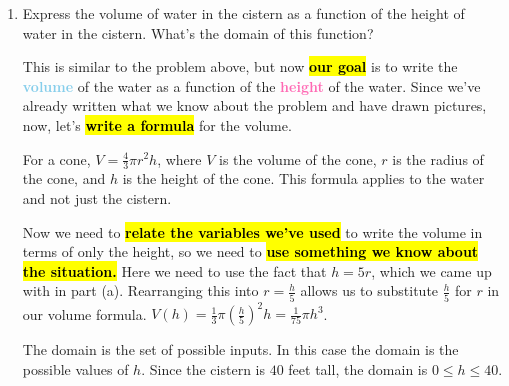 \documentclass{article}
\newcommand{\goal}[1]{\textbf{\textcolor{skyblue}{#1}}}
\newcommand{\indvar}[1]{\textbf{\textcolor{hotpink}{#1}}}
\begin{document}
\begin{enumerate}
\begin{enumerate}
  \item
    \begin{problem}[\vfill\newpage]
      Express the volume of water in the cistern as a function of the height of water in the cistern. What's the domain of this function?
    \end{problem}

    \begin{solution} 
      This is similar to the problem above, but now \hl{\textbf{our goal}} is to write the 
      \goal{volume} of the water as a function
      of the \indvar{height} of the water. Since we've already written what we know about the problem and have drawn 
      pictures, now, let's \hl{\textbf{write a formula}} for the volume. 
      
      For a cone, $V = \frac{4}{3}\pi r^2 h$, where $V$ is the volume of the cone, $r$ is the radius of the cone, and
      $h$ is the height of the cone. This formula applies to the water and not just the cistern.
      
      Now we need to \hl{\textbf{relate the variables we've used}} to write the volume in terms of only the height,
      so we need to \hl{\textbf{use something we know about the situation.}} Here we need to use the fact that $h = 5r$,
      which we came up with in part (a). Rearranging this into $r=\frac{h}{5}$ allows us to substitute $\frac{h}{5}$ for
      $r$ in our volume formula. $V(h) = \frac{1}{3} \pi ( \frac{h}{5})^2 h = \boxed{ \frac{1}{75} \pi h^3}$.

      The domain is the set of possible inputs. In this case the domain is the possible values of $h$. 
      Since the cistern is $40$ feet tall, the domain is $\boxed{0 \leq h \leq 40}$.
    \end{solution}

  \end{enumerate}

\end{enumerate}
\end{document}
